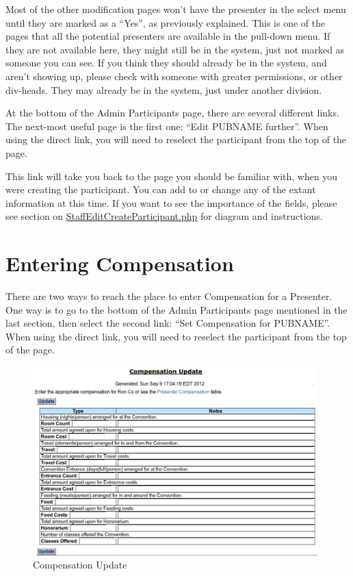 \documentclass[tablesignature]{scrartcl}
\begin{document}
  Most of the other modification pages won't have the presenter in the
  select menu until they are marked as a ``Yes'', as previously
  explained.  This is one of the pages that all the potential
  presenters are available in the pull-down menu.  If they are not
  available here, they might still be in the system, just not marked
  as someone you can see.  If you think they should already be in the
  system, and aren't showing up, please check with someone with
  greater permissions, or other div-heads.  They may already be in the
  system, just under another division.

  At the bottom of the Admin Participants page, there are several
  different links.  The next-most useful page is the first one: ``Edit
  PUBNAME further''. When using the direct link, you will need to
  reselect the participant from the top of the page.


  This link will take you back to the page you should be familiar
  with, when you were creating the participant.  You can add to or
  change any of the extant information at this time.  If you want to
  see the importance of the fields, please see section on
  \hyperref[StaffEditCreateParticipant.php]{StaffEditCreateParticipant.php} for diagram and instructions.
\section{Entering Compensation}
\label{sec-4}


  There are two ways to reach the place to enter Compensation for a
  Presenter.  One way is to go to the bottom of the Admin Participants
  page mentioned in the last section, then select the second link:
  ``Set Compensation for PUBNAME''.  When using the direct link, you
  will need to reselect the participant from the top of the page.

\begin{figure}[H]
\centering
\includegraphics[width=0.98\textwidth]{./Images/Compensation_Update.png}
\caption{\label{fig:Zambia_Presenter_Flow_Compensation_Update}Compensation Update}
\end{figure}
\end{document}

